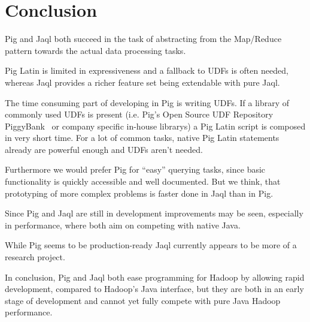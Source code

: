 \section{Conclusion}

Pig and Jaql both succeed in the task of abstracting from the Map/Reduce pattern towards the actual data processing tasks.

Pig Latin is limited in expressiveness and a fallback to UDFs is often needed, whereas Jaql provides a
richer feature set being extendable with pure Jaql.

The time consuming part of developing in Pig is writing UDFs. If a library of commonly used UDFs is present (i.e. Pig's Open Source UDF Repository PiggyBank~\cite{pigPiggyBank} or company specific in-house librarys) a Pig Latin script is composed in very short time. For a lot of common tasks, native Pig Latin statements already are powerful enough and UDFs aren't needed.

Furthermore we would prefer Pig for ``easy'' querying tasks, since basic functionality is quickly accessible and well documented. But we think, that prototyping of more complex problems is faster done in Jaql than in Pig.

Since Pig and Jaql are still in development improvements may be seen, especially in performance, where
both aim on competing with native Java.

While Pig seems to be production-ready Jaql currently appears to be more of a research project. 

In conclusion, Pig and Jaql both ease programming for Hadoop by allowing rapid development, compared to
Hadoop's Java interface, but they are both in an early stage of development and cannot yet fully
compete with pure Java Hadoop performance.